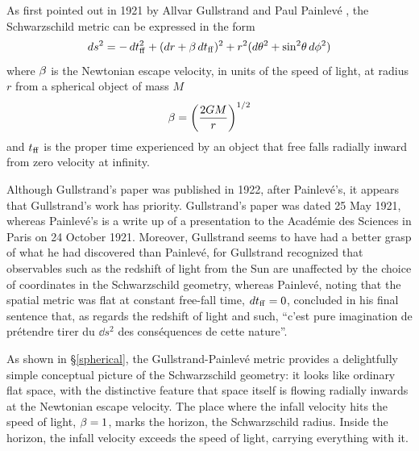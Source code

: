 \documentclass[twocolumn,showpacs,preprintnumbers,amsmath,amssymb,prb]{revtex4}
\begin{document}
As first pointed out in 1921 by
Allvar Gullstrand
\cite{Gullstrand}
and
Paul Painlev\'e
\cite{Painleve},
the Schwarzschild
\cite{AL04,Rothman02}
metric can be expressed in the form
\begin{equation}
\label{gullstrandmetric}
  d s^2
  =
  - \, d t_{\rm ff}^2 + (d r + \beta \, d t_{\rm ff})^2
  + r^2 (d\theta^2 + \sin^2\!\theta \, d\phi^2)
\end{equation}
where
$\beta$ is the Newtonian escape velocity,
in units of the speed of light, at radius $r$
from a spherical object of mass $M$
\begin{equation}
  \beta = \left( {2 G M \over r} \right)^{1/2}
\end{equation}
and $t_{\rm ff}$ is
the proper time experienced by an object that
free falls radially inward from zero velocity at infinity.

Although Gullstrand's paper was published in 1922,
after Painlev\'e's,
it appears that Gullstrand's work has priority.
Gullstrand's paper was dated 25 May 1921,
whereas Painlev\'e's is a write up of a presentation to
the Acad\'emie des Sciences in Paris on 24 October 1921.
Moreover, Gullstrand seems to have had a better grasp of what he had discovered
than Painlev\'e,
for Gullstrand recognized that observables
such as the redshift of light from the Sun
are unaffected by the choice of coordinates in the Schwarzschild geometry,
whereas Painlev\'e, noting that the spatial metric was flat
at constant free-fall time, $d t_{\rm ff} = 0$,
concluded in his final sentence that,
as regards the redshift of light and such,
``c'est pure imagination de pr\'etendre
tirer du $\dd s^2$ des cons\'equences de cette nature''.

As shown in \S\ref{spherical},
the Gullstrand-Painlev\'e metric
provides a delightfully simple conceptual picture of
the Schwarzschild geometry:
it looks like ordinary flat space,
with the distinctive feature that space itself is flowing
radially inwards at the Newtonian escape velocity.
The place where the infall velocity hits the speed of light,
$\beta = 1$,
marks the horizon, the Schwarzschild radius.
Inside the horizon, the infall velocity exceeds the speed of light,
carrying everything with it.
\end{document}
